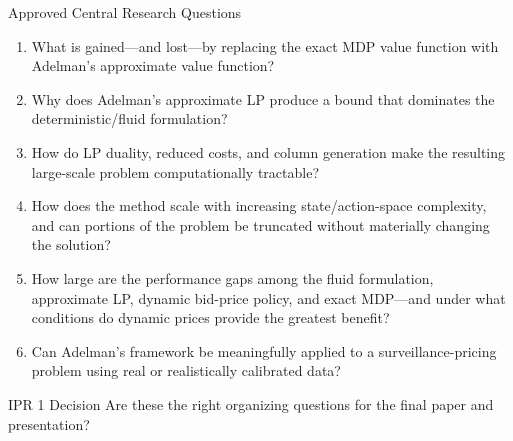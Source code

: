 \documentclass[aspectratio=169,9pt]{beamer}
\begin{document}
\begin{frame}[t]{Approved Central Research Questions}
\footnotesize
\begin{enumerate}
    \item What is gained---and lost---by replacing the exact MDP value function with Adelman's approximate value function?
    \item Why does Adelman's approximate LP produce a bound that dominates the deterministic/fluid formulation?
    \item How do LP duality, reduced costs, and column generation make the resulting large-scale problem computationally tractable?
    \item How does the method scale with increasing state/action-space complexity, and can portions of the problem be truncated without materially changing the solution?
    \item How large are the performance gaps among the fluid formulation, approximate LP, dynamic bid-price policy, and exact MDP---and under what conditions do dynamic prices provide the greatest benefit?
    \item Can Adelman's framework be meaningfully applied to a surveillance-pricing problem using real or realistically calibrated data?
\end{enumerate}

\vspace{0.3em}
\begin{block}{IPR 1 Decision}
Are these the right organizing questions for the final paper and presentation?
\end{block}
\end{frame}
\end{document}
